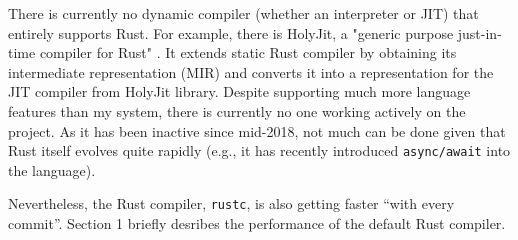 There is currently no dynamic compiler (whether an interpreter or JIT) that
entirely supports Rust. For example, there is HolyJit, a "generic purpose
just-in-time compiler for Rust" \cite{holyjit}. It extends static Rust
compiler by obtaining its intermediate representation (MIR) and converts it
into a representation for the JIT compiler from HolyJit library. Despite
supporting much more language features than my system, there is currently no
one working actively on the project. As it has been inactive since mid-2018,
not much can be done given that Rust itself evolves quite rapidly (e.g., it has
recently introduced \texttt{async/await} into the language).

Nevertheless, the Rust compiler, \texttt{rustc}, is also getting
faster ``with every commit''. Section 1 briefly desribes
the performance of the default Rust compiler.
